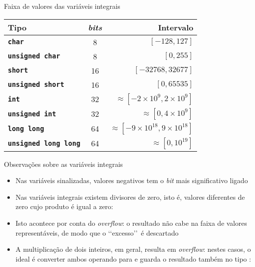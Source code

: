 \begin{frame}[fragile]{Faixa de valores das variáveis integrais}

    \begin{table}[!ht]
        \centering

        \begin{tabular}{lcr}
            \toprule
            \textbf{Tipo} & \textit{bits} & \textbf{Intervalo} \\
            \midrule
            \texttt{\textbf{char}} & 8 & $[-128, 127]$ \\
            \rowcolor[gray]{0.9}
            \texttt{\textbf{unsigned char}} & 8 & $[0, 255]$ \\
            \texttt{\textbf{short}} & 16 & $[-32768, 32677]$ \\
            \rowcolor[gray]{0.9}
            \texttt{\textbf{unsigned short}} & 16 & $[0, 65535]$ \\
            \texttt{\textbf{int}} & 32 & $\approx [-2\times 10^9, 2\times 10^9]$ \\
            \rowcolor[gray]{0.9}
            \texttt{\textbf{unsigned int}} & 32 & $\approx [0, 4\times 10^9]$ \\
            \texttt{\textbf{long long}} & 64 & $\approx [-9\times 10^{18}, 9\times 10^{18}]$ \\
            \rowcolor[gray]{0.9}
            \texttt{\textbf{unsigned long long}} & 64 & $\approx [0, 10^{19}]$ \\
            \bottomrule
        \end{tabular}
    \end{table}

\end{frame}

\begin{frame}[fragile]{Observações sobre as variáveis integrais}

    \begin{itemize}
        \item Nas variáveis sinalizadas, valores negativos tem o \textit{bit} mais significativo
            ligado

        \item Nas variáveis integrais existem divisores de zero, isto é, valores diferentes de
            zero cujo produto é igual a zero:

        \item Isto acontece por conta do \textit{overflow}: o resultado não cabe na faixa de
            valores representáveis, de modo que o \lq\lq excesso\rq\rq\ é descartado

        \item A multiplicação de dois inteiros, em geral, resulta em \textit{overflow}: nestes
            casos, o ideal é converter ambos operando para  e guarda o
            resultado também no tipo :
    \end{itemize}

\end{frame}

